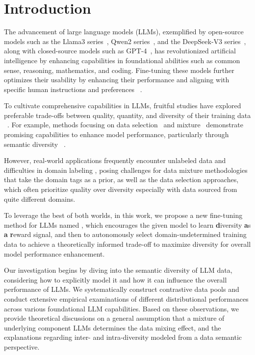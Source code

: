 \section{Introduction}
The advancement of large language models (LLMs), exemplified by open-source models such as the Llama3 series~\cite{llama3series}, Qwen2 series~\cite{qwen2series}, and the DeepSeek-V3 series~\cite{deepseekv3}, along with closed-source models such as GPT-4~\cite{gpt4}, has revolutionized artificial intelligence by enhancing capabilities in foundational abilities such as common sense, reasoning, mathematics, and coding. Fine-tuning these models further optimizes their usability by enhancing their performance and aligning with specific human instructions and preferences ~\cite{alpaca2023, dpo}.

To cultivate comprehensive capabilities in LLMs, 
fruitful studies have explored preferable trade-offs between quality, quantity, and diversity of their training data  ~\cite{li2024quantity,djv2,qin2024surveycodev,zhao2024beyond}.
For example, methods focusing on data selection~\cite{li2024super, xialess,wang2023far} and mixture~\cite{ge2024bimix} demonstrate promising capabilities to enhance model performance, particularly through semantic diversity ~\cite{lu2023instag, liu2023deita}.

However, real-world applications frequently encounter unlabeled data and difficulties in domain labeling \cite{ge2023openagi}, posing challenges for data mixture methodologies that take the domain tags as a prior, as well as the data selection approaches, which often prioritize quality over diversity especially with data sourced from quite different domains.

To leverage the best of both worlds, in this work, we propose a new fine-tuning method for LLMs named \ours, which encourages the given model to learn \textbf{d}iversity \textbf{a}s \textbf{a} \textbf{r}eward signal, and then to autonomously select domain-undetermined training data to achieve a theoretically informed trade-off to maximize diversity for overall model performance enhancement.

Our investigation begins by diving into the semantic diversity of LLM data, considering how to explicitly model it and how it can influence the overall performance of LLMs. We systematically construct contrastive data pools and conduct extensive empirical examinations of different distributional performances across various foundational LLM capabilities. Based on these observations, we provide theoretical discussions on a general assumption that a mixture of underlying component LLMs determines the data mixing effect, and the explanations regarding inter- and intra-diversity modeled from a data semantic perspective.


